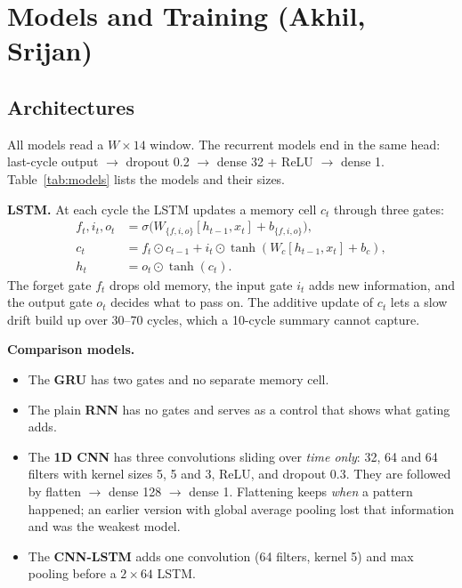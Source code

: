 \documentclass[conference]{IEEEtran}
\begin{document}
\section{Models and Training (Akhil, Srijan)}
\label{sec:models}

\subsection{Architectures}
All models read a $W\times14$ window. The recurrent models end in the same head: last-cycle output $\to$ dropout 0.2 $\to$ dense 32 + ReLU $\to$ dense 1. Table~\ref{tab:models} lists the models and their sizes.

\textbf{LSTM.} At each cycle the LSTM \cite{hochreiter1997lstm} updates a memory cell $c_t$ through three gates:
\begin{align}
f_t,i_t,o_t &= \sigma\big(W_{\{f,i,o\}}[h_{t-1},x_t]+b_{\{f,i,o\}}\big),\\
c_t &= f_t\odot c_{t-1}+i_t\odot\tanh(W_c[h_{t-1},x_t]+b_c),\\
h_t &= o_t\odot\tanh(c_t).
\end{align}
The forget gate $f_t$ drops old memory, the input gate $i_t$ adds new information, and the output gate $o_t$ decides what to pass on. The additive update of $c_t$ lets a slow drift build up over 30--70 cycles, which a 10-cycle summary cannot capture.

\textbf{Comparison models.}
\begin{itemize}
  \item The \textbf{GRU} \cite{cho2014gru} has two gates and no separate memory cell.
  \item The plain \textbf{RNN} has no gates and serves as a control that shows what gating adds.
  \item The \textbf{1D CNN} has three convolutions sliding over \emph{time only}: 32, 64 and 64 filters with kernel sizes 5, 5 and 3, ReLU, and dropout 0.3. They are followed by flatten $\to$ dense 128 $\to$ dense 1. Flattening keeps \emph{when} a pattern happened; an earlier version with global average pooling lost that information and was the weakest model.
  \item The \textbf{CNN-LSTM} \cite{muthukumar2024cnnlstm} adds one convolution (64 filters, kernel 5) and max pooling before a $2\times64$ LSTM.
\end{itemize}
\end{document}

